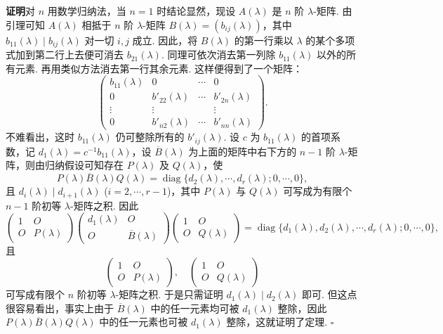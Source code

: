 \documentclass[UTF8, 12pt, fontset=fandol, oneside]{ctexart}
\begin{document}
\noindent\textbf{证明}\quad 对 $n$ 用数学归纳法，当 $n=1$ 时结论显然，现设 $A(\lambda)$ 是 $n$ 阶 $\lambda$-矩阵. 由引理可知 $A(\lambda)$ 相抵于 $n$ 阶 $\lambda$-矩阵 $B(\lambda)=(b_{ij}(\lambda))$，其中 $b_{11}(\lambda)\mid b_{ij}(\lambda)$ 对一切 $i,j$ 成立. 因此，将 $B(\lambda)$ 的第一行乘以 $\lambda$ 的某个多项式加到第二行上去便可消去 $b_{21}(\lambda)$. 同理可依次消去第一列除 $b_{11}(\lambda)$ 以外的所有元素. 再用类似方法消去第一行其余元素. 这样便得到了一个矩阵：
\[
\left(\begin{array}{cccc}
b_{11}(\lambda) & 0 & \cdots & 0\\
0 & b'_{22}(\lambda) & \cdots & b'_{2n}(\lambda)\\
\vdots & \vdots & & \vdots\\
0 & b'_{n2}(\lambda) & \cdots & b'_{nn}(\lambda)
\end{array}\right).
\]
不难看出，这时 $b_{11}(\lambda)$ 仍可整除所有的 $b'_{ij}(\lambda)$. 设 $c$ 为 $b_{11}(\lambda)$ 的首项系数，记 $d_1(\lambda)=c^{-1}b_{11}(\lambda)$，设 $\overline{B}(\lambda)$ 为上面的矩阵中右下方的 $n-1$ 阶 $\lambda$-矩阵，则由归纳假设可知存在 $P(\lambda)$ 及 $Q(\lambda)$，使
\[
P(\lambda)\overline{B}(\lambda)Q(\lambda)=\operatorname{diag}\{d_2(\lambda),\cdots,d_r(\lambda);0,\cdots,0\},
\]
且 $d_i(\lambda)\mid d_{i+1}(\lambda)$ ($i=2,\cdots,r-1$)，其中 $P(\lambda)$ 与 $Q(\lambda)$ 可写成为有限个 $n-1$ 阶初等 $\lambda$-矩阵之积. 因此
\[
\left(\begin{array}{cc}
1 & O\\
O & P(\lambda)
\end{array}\right)
\left(\begin{array}{cc}
d_1(\lambda) & O\\
O & \overline{B}(\lambda)
\end{array}\right)
\left(\begin{array}{cc}
1 & O\\
O & Q(\lambda)
\end{array}\right)
=\operatorname{diag}\{d_1(\lambda),d_2(\lambda),\cdots,d_r(\lambda);0,\cdots,0\},
\]
且
\[
\left(\begin{array}{cc}
1 & O\\
O & P(\lambda)
\end{array}\right),\quad
\left(\begin{array}{cc}
1 & O\\
O & Q(\lambda)
\end{array}\right)
\]
可写成有限个 $n$ 阶初等 $\lambda$-矩阵之积. 于是只需证明 $d_1(\lambda)\mid d_2(\lambda)$ 即可. 但这点很容易看出，事实上由于 $\overline{B}(\lambda)$ 中的任一元素均可被 $d_1(\lambda)$ 整除，因此 $P(\lambda)\overline{B}(\lambda)Q(\lambda)$ 中的任一元素也可被 $d_1(\lambda)$ 整除，这就证明了定理. $\square$
\end{document}
